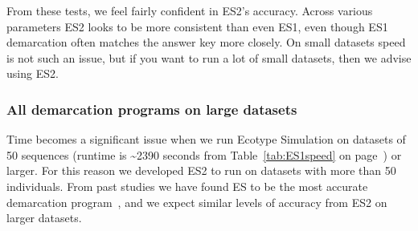 From these tests, we feel fairly confident in ES2's accuracy.
Across various parameters ES2 looks to be more consistent than even ES1, even though ES1 demarcation often matches the answer key more closely.
On small datasets speed is not such an issue, but if you want to run a lot of small datasets, then we advise using ES2.

\subsubsection*{All demarcation programs on large datasets}
Time becomes a significant issue when we run Ecotype Simulation on datasets of 50 sequences (runtime is \textasciitilde2390 seconds from Table~\ref{tab:ES1speed} on page~\pageref{tab:ES1speed}) or larger.
For this reason we developed ES2 to run on datasets with more than 50 individuals.
From past studies we have found ES to be the most accurate demarcation program~\cite{carlo}, and we expect similar levels of accuracy from ES2 on larger datasets.

%

